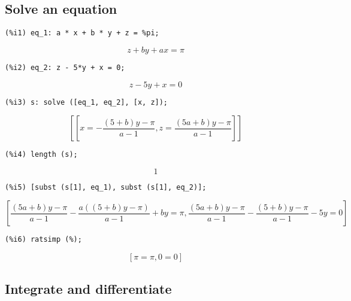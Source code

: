 \documentclass[12pt,leqno]{article}
\begin{document}
\subsection{Solve an equation}
\begin{verbatim}
(%i1) eq_1: a * x + b * y + z = %pi;
\end{verbatim}
\begin{dmath}[number={\(\mathop{\mathrm{\%o}_{1}}\)}]
z+b y+a x = \pi
\end{dmath}
\begin{verbatim}
(%i2) eq_2: z - 5*y + x = 0;
\end{verbatim}
\begin{dmath}[number={\(\mathop{\mathrm{\%o}_{2}}\)}]
z-5 y+x = 0
\end{dmath}
\begin{verbatim}
(%i3) s: solve ([eq_1, eq_2], [x, z]);
\end{verbatim}
\begin{dmath}[number={\(\mathop{\mathrm{\%o}_{3}}\)}]
\left[\left[x = -\frac{\left(5+b\right) y-\pi}{a-1}, z = \frac{\left(5 a+b\right) y-\pi}{a-1}\right]\right]
\end{dmath}
\begin{verbatim}
(%i4) length (s);
\end{verbatim}
\begin{dmath}[number={\(\mathop{\mathrm{\%o}_{4}}\)}]
1
\end{dmath}
\begin{verbatim}
(%i5) [subst (s[1], eq_1), subst (s[1], eq_2)];
\end{verbatim}
\begin{dmath}[number={\(\mathop{\mathrm{\%o}_{5}}\)}]
\left[\frac{\left(5 a+b\right) y-\pi}{a-1}-\frac{a \left(\left(5+b\right) y-\pi\right)}{a-1}+b y = \pi, \frac{\left(5 a+b\right) y-\pi}{a-1}-\frac{\left(5+b\right) y-\pi}{a-1}-5 y = 0\right]
\end{dmath}
\begin{verbatim}
(%i6) ratsimp (%);
\end{verbatim}
\begin{dmath}[number={\(\mathop{\mathrm{\%o}_{6}}\)}]
\left[\pi = \pi, 0 = 0\right]
\end{dmath}


\subsection{Integrate and differentiate}
\end{document}
